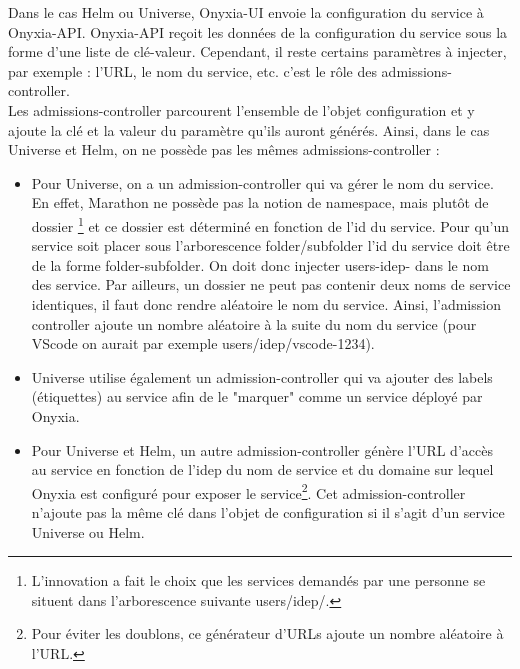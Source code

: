 \documentclass[11pt,fleqn]{book} %
\begin{document}
\vspace{-0.5cm}
Dans le cas Helm ou Universe, Onyxia-UI envoie la configuration du service à Onyxia-API. Onyxia-API reçoit les données de la configuration du service sous la forme d'une liste de clé-valeur. Cependant, il reste certains paramètres à injecter, par exemple : l'URL, le nom du service, etc. c'est le rôle des admissions-controller.\\

Les admissions-controller parcourent l'ensemble de l'objet configuration et y ajoute la clé et la valeur du paramètre qu'ils auront générés. Ainsi, dans le cas Universe et Helm, on ne possède pas les mêmes admissions-controller : \\
\begin{itemize}
    \item Pour Universe, on a un admission-controller qui va gérer le nom du service. En effet, Marathon ne possède pas la notion de namespace, mais plutôt de dossier \footnote{L'innovation a fait le choix que les services demandés par une personne se situent dans l'arborescence suivante users/idep/.} et ce dossier est déterminé en fonction de l'id du service. Pour qu'un service soit placer sous l'arborescence folder/subfolder l'id du service doit être de la forme folder-subfolder. On doit donc injecter users-idep- dans le nom des service. Par ailleurs, un dossier ne peut pas contenir deux noms de service identiques, il faut donc rendre aléatoire le nom du service. Ainsi, l'admission controller ajoute un nombre aléatoire à la suite du nom du service (pour VScode on aurait par exemple users/idep/vscode-1234).\\
    
    \item Universe utilise également un admission-controller qui va ajouter des labels (étiquettes) au service afin de le "marquer" comme un service déployé par Onyxia. \\
    
    \item Pour Universe et Helm, un autre admission-controller génère l'URL d'accès au service en fonction de l'idep du nom de service et du domaine sur lequel Onyxia est configuré pour exposer le service\footnote{Pour éviter les doublons, ce générateur d'URLs ajoute un nombre aléatoire à l'URL.}. Cet admission-controller n'ajoute pas la même clé dans l'objet de configuration si il s'agit d'un service Universe ou Helm.\\
\end{itemize}
\end{document}
